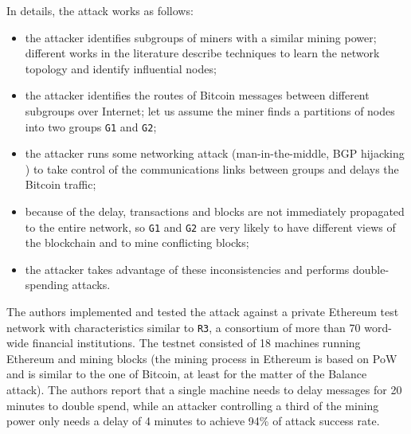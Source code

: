 In details, the attack works as follows:
\begin{itemize}
	\item the attacker identifies subgroups of miners with a similar mining power; different works in the literature \cite{deanonymization_2014, discovering_influential_nodes_2014} describe techniques to learn the network topology and identify influential nodes;
	\item the attacker identifies the routes of Bitcoin messages between different subgroups over Internet; let us assume the miner finds a partitions of nodes into two groups \texttt{G1} and \texttt{G2};
	\item the attacker runs some networking attack (man-in-the-middle, BGP hijacking \cite{bgp_hijacking_secureworks}) to take control of the communications links between groups and delays the Bitcoin traffic;
	\item because of the delay, transactions and blocks are not immediately propagated to the entire network, so \texttt{G1} and \texttt{G2} are very likely to have different views of the blockchain and to mine conflicting blocks;
	\item the attacker takes advantage of these inconsistencies and performs double-spending attacks.
\end{itemize}

The authors implemented and tested the attack against a private Ethereum test network with characteristics similar to \texttt{R3}, a consortium of more than \num{70} word-wide financial institutions.
The testnet consisted of \num{18} machines running Ethereum and mining blocks (the mining process in Ethereum is based on \ac{PoW} and is similar to the one of Bitcoin, at least for the matter of the Balance attack).
The authors report that a single machine needs to delay messages for \num{20} minutes to double spend, while an attacker controlling a third of the mining power only needs a delay of \num{4} minutes to achieve \num{94}\% of attack success rate.
